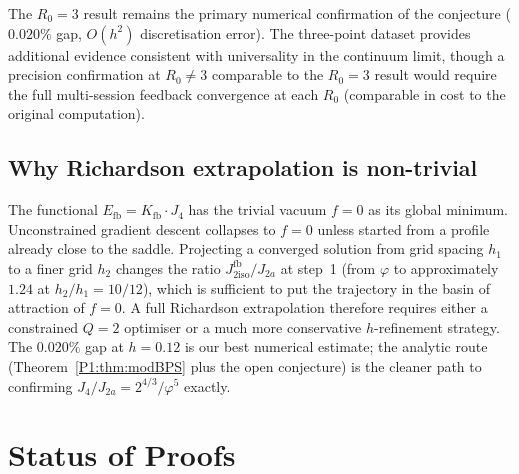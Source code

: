 \documentclass[11pt,a4paper]{article}
\theoremstyle{definition}
\theoremstyle{remark}
\newcommand{\vp}{\varphi}
\newcommand{\Kfb}{K_{\mathrm{fb}}}
\newcommand{\Efb}{E_{\mathrm{fb}}}
\newcommand{\Jfb}{J_{2\mathrm{iso}}^{\mathrm{fb}}}
\newcommand{\Ja}{J_{2a}}
\newcommand{\Jfour}{J_{4}}
\begin{document}
The $R_0=3$ result remains the primary numerical confirmation
of the conjecture ($0.020\%$ gap, $O(h^2)$ discretisation
error).  The three-point dataset provides additional evidence
consistent with universality in the continuum limit, though a
precision confirmation at $R_0\neq 3$ comparable to the $R_0=3$
result would require the full multi-session feedback convergence
at each $R_0$ (comparable in cost to the original computation).

\subsection{Why Richardson extrapolation is non-trivial}

The functional $\Efb = \Kfb\cdot\Jfour$ has the trivial vacuum $f=0$ as
its global minimum.  Unconstrained gradient descent collapses to $f=0$
unless started from a profile already close to the saddle.  Projecting a
converged solution from grid spacing $h_1$ to a finer grid $h_2$ changes
the ratio $\Jfb/\Ja$ at step~1 (from $\vp$ to approximately $1.24$ at
$h_2/h_1=10/12$), which is sufficient to put the trajectory in the basin of
attraction of $f=0$.  A full Richardson extrapolation therefore requires
either a constrained $Q=2$ optimiser or a much more conservative
$h$-refinement strategy.  The $0.020\%$ gap at $h=0.12$ is our best
numerical estimate; the analytic route (Theorem~\ref{P1:thm:modBPS} plus
the open conjecture) is the cleaner path to confirming $\Jfour/\Ja =
2^{4/3}/\vp^5$ exactly.

\section{Status of Proofs}
\label{P1:sec:open}
\end{document}
